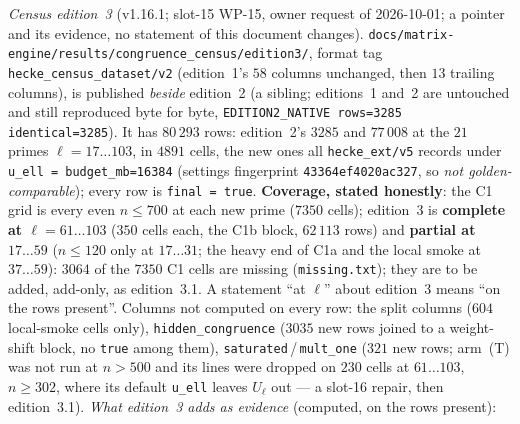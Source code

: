 \documentclass[11pt]{article}
\theoremstyle{remark}
\begin{document}
\noindent\emph{Census edition~3} (v1.16.1; slot-15 WP-15, owner request of 2026-10-01; a pointer and its evidence, no statement of
this document changes). \texttt{docs/matrix-engine/results/congruence\_census/edition3/}, format tag
\texttt{hecke\_census\_dataset/v2} (edition~1's $58$ columns unchanged, then $13$ trailing columns), is published \emph{beside}
edition~2 (a sibling; editions~1 and~2 are untouched and still reproduced byte for byte, \texttt{EDITION2\_NATIVE rows=3285
identical=3285}). It has $80\,293$ rows: edition~2's $3285$ and $77\,008$ at the $21$ primes $\ell=17\ldots103$, in $4891$ cells, the
new ones all \texttt{hecke\_ext/v5} records under \texttt{u\_ell = budget\_mb=16384} (settings fingerprint \texttt{43364ef4020ac327},
so \emph{not golden-comparable}); every row is \texttt{final = true}. \textbf{Coverage, stated honestly}: the C1 grid is every even
$n\le700$ at each new prime ($7350$ cells); edition~3 is \textbf{complete at $\ell=61\ldots103$} ($350$ cells each, the C1b block,
$62\,113$ rows) and \textbf{partial at $17\ldots59$} ($n\le120$ only at $17\ldots31$; the heavy end of C1a and the local smoke at
$37\ldots59$): $3064$ of the $7350$ C1 cells are missing (\texttt{missing.txt}); they are to be added, add-only, as edition~3.1. A
statement ``at $\ell$'' about edition~3 means ``on the rows present''. Columns not computed on every row: the split columns ($604$
local-smoke cells only), \texttt{hidden\_congruence} ($3035$ new rows joined to a weight-shift block, no \texttt{true} among them),
\texttt{saturated}\,/\,\texttt{mult\_one} ($321$ new rows; arm~(T) was not run at $n>500$ and its lines were dropped on $230$ cells at
$61\ldots103$, $n\ge302$, where its default \texttt{u\_ell} leaves $U_\ell$ out --- a slot-16 repair, then edition~3.1).
\emph{What edition~3 adds as evidence} (computed, on the rows present):
\end{document}
